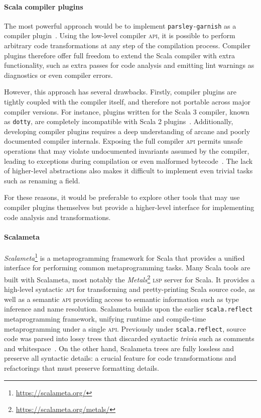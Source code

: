 \documentclass[../../main.tex]{subfiles}
\begin{document}
\paragraph{Scala compiler plugins}
The most powerful approach would be to implement \texttt{parsley-garnish} as a compiler plugin~\cite{pickering_plugins_2019}.
Using the low-level compiler \textsc{api}, it is possible to perform arbitrary code transformations at any step of the compilation process.
Compiler plugins therefore offer full freedom to extend the Scala compiler with extra functionality, such as extra passes for code analysis and emitting lint warnings as diagnostics or even compiler errors.

However, this approach has several drawbacks.
Firstly, compiler plugins are tightly coupled with the compiler itself, and therefore not portable across major compiler versions.
For instance, plugins written for the Scala 3 compiler, known as \texttt{dotty}, are completely incompatible with Scala 2 plugins~\cite{lampepfl_changes_2022}.
Additionally, developing compiler plugins requires a deep understanding of arcane and poorly documented compiler internals.
Exposing the full compiler \textsc{api} permits unsafe operations that may violate undocumented invariants assumed by the compiler, leading to exceptions during compilation or even malformed bytecode~\cite{sherwany_refactoring_2015}.
The lack of higher-level abstractions also makes it difficult to implement even trivial tasks such as renaming a field.

For these reasons, it would be preferable to explore other tools that may use compiler plugins themselves but provide a higher-level interface for implementing code analysis and transformations.

\paragraph{Scalameta}
\textit{Scalameta}\footnote{\url{https://scalameta.org/}} is a metaprogramming framework for Scala that provides a unified interface for performing common metaprogramming tasks.
Many Scala tools are built with Scalameta, most notably the \emph{Metals}\footnote{\url{https://scalameta.org/metals/}} \textsc{lsp} server for Scala.
It provides a high-level syntactic \textsc{api} for transforming and pretty-printing Scala source code, as well as a semantic \textsc{api} providing access to semantic information such as type inference and name resolution.
Scalameta builds upon the earlier \texttt{scala.reflect} metaprogramming framework, unifying runtime and compile-time metaprogramming under a single \textsc{api}.
Previously under \texttt{scala.reflect}, source code was parsed into lossy trees that discarded syntactic \emph{trivia} such as comments and whitespace~\cite{burmako_scalameta_2017}.
On the other hand, Scalameta trees are fully lossless and preserve all syntactic details: a crucial feature for code transformations and refactorings that must preserve formatting details.
\end{document}
